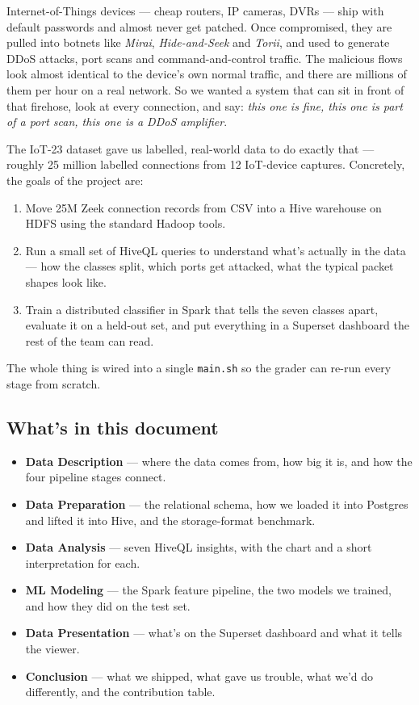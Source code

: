 \documentclass[11pt,a4paper]{article}
\begin{document}
Internet-of-Things devices --- cheap routers, IP cameras, DVRs --- ship
with default passwords and almost never get patched. Once compromised, they
are pulled into botnets like \emph{Mirai}, \emph{Hide-and-Seek} and
\emph{Torii}, and used to generate DDoS attacks, port scans and
command-and-control traffic. The malicious flows look almost identical to
the device's own normal traffic, and there are millions of them per hour on
a real network. So we wanted a system that can sit in front of that
firehose, look at every connection, and say: \emph{this one is fine, this
one is part of a port scan, this one is a DDoS amplifier}.

The IoT-23 dataset gave us labelled, real-world data to do exactly that ---
roughly 25 million labelled connections from 12 IoT-device captures.
Concretely, the goals of the project are:

\begin{enumerate}[leftmargin=2em]
    \item Move 25M Zeek connection records from CSV into a Hive warehouse on
    HDFS using the standard Hadoop tools.
    \item Run a small set of HiveQL queries to understand what's actually in
    the data --- how the classes split, which ports get attacked, what the
    typical packet shapes look like.
    \item Train a distributed classifier in Spark that tells the seven
    classes apart, evaluate it on a held-out set, and put everything in a
    Superset dashboard the rest of the team can read.
\end{enumerate}

The whole thing is wired into a single \texttt{main.sh} so the grader can
re-run every stage from scratch.

\subsection{What's in this document}

\begin{itemize}[leftmargin=2em,itemsep=0.2em]
    \item \textbf{Data Description} --- where the data comes from, how big
    it is, and how the four pipeline stages connect.
    \item \textbf{Data Preparation} --- the relational schema, how we
    loaded it into Postgres and lifted it into Hive, and the storage-format
    benchmark.
    \item \textbf{Data Analysis} --- seven HiveQL insights, with the
    chart and a short interpretation for each.
    \item \textbf{ML Modeling} --- the Spark feature pipeline, the two
    models we trained, and how they did on the test set.
    \item \textbf{Data Presentation} --- what's on the Superset dashboard
    and what it tells the viewer.
    \item \textbf{Conclusion} --- what we shipped, what gave us trouble,
    what we'd do differently, and the contribution table.
\end{itemize}
\end{document}
